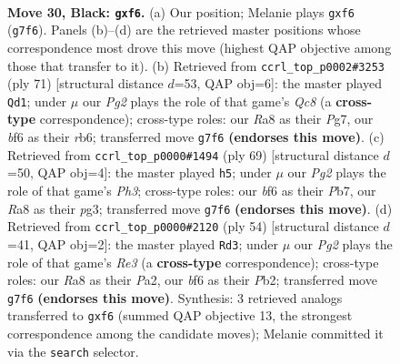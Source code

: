 \documentclass[11pt]{article}
\begin{document}
\clearpage

\begin{figure}[p]\centering
\begin{subfigure}{0.46\textwidth}\centering
\resizebox{\linewidth}{!}{%
\newchessgame
\chessboard[
  setfen={r7/2p1k1pp/3p1B2/8/pP4Q1/6P1/P4PKP/1q6 b - - 0 30},
  showmover=false,
  pgfstyle=straightmove, color=movearrow, markmove={g7-f6}
]}
\caption{}
\end{subfigure}\hfill
\begin{subfigure}{0.46\textwidth}\centering
\resizebox{\linewidth}{!}{%
\newchessgame
\chessboard[
  setfen={8/5kp1/1R2p3/p4p1p/2P2P2/3rP1P1/4QPK1/2q5 b - - 4 36},
  showmover=false,
  pgfstyle=straightmove, color=movearrow, markmove={c1-d1}
]}
\caption{}
\end{subfigure}
\\[4pt]
\begin{subfigure}{0.46\textwidth}\centering
\resizebox{\linewidth}{!}{%
\newchessgame
\chessboard[
  setfen={8/1p2Qp2/2p3kp/2P5/p7/P2qP1P1/5PK1/8 b - - 8 35},
  showmover=false,
  pgfstyle=straightmove, color=movearrow, markmove={h6-h5}
]}
\caption{}
\end{subfigure}\hfill
\begin{subfigure}{0.46\textwidth}\centering
\resizebox{\linewidth}{!}{%
\newchessgame
\chessboard[
  setfen={5rk1/5pp1/p6p/1Q1p4/3q2P1/4R2P/PP3P2/6K1 w - - 0 28},
  showmover=false,
  pgfstyle=straightmove, color=movearrow, markmove={e3-d3}
]}
\caption{}
\end{subfigure}
\caption{\textbf{Move 30, Black: \texttt{gxf6}.} (a) Our position; Melanie plays \texttt{gxf6} (\texttt{g7f6}). Panels (b)--(d) are the retrieved master positions whose correspondence most drove this move (highest QAP objective among those that transfer to it). (b) Retrieved from \texttt{ccrl\_top\_p0002\#3253} (ply 71) [structural distance $d$=53, QAP obj=6]: the master played \texttt{Qd1}; under $\mu$ our \emph{Pg2} plays the role of that game's \emph{Qc8} (a \textbf{cross-type} correspondence); cross-type roles: our \emph{R}a8 as their \emph{P}g7, our \emph{b}f6 as their \emph{r}b6; transferred move \texttt{g7f6} \textbf{(endorses this move)}. (c) Retrieved from \texttt{ccrl\_top\_p0000\#1494} (ply 69) [structural distance $d$=50, QAP obj=4]: the master played \texttt{h5}; under $\mu$ our \emph{Pg2} plays the role of that game's \emph{Ph3}; cross-type roles: our \emph{b}f6 as their \emph{P}b7, our \emph{R}a8 as their \emph{p}g3; transferred move \texttt{g7f6} \textbf{(endorses this move)}. (d) Retrieved from \texttt{ccrl\_top\_p0000\#2120} (ply 54) [structural distance $d$=41, QAP obj=2]: the master played \texttt{Rd3}; under $\mu$ our \emph{Pg2} plays the role of that game's \emph{Re3} (a \textbf{cross-type} correspondence); cross-type roles: our \emph{R}a8 as their \emph{P}a2, our \emph{b}f6 as their \emph{P}b2; transferred move \texttt{g7f6} \textbf{(endorses this move)}. Synthesis: 3 retrieved analogs transferred to \texttt{gxf6} (summed QAP objective 13, the strongest correspondence among the candidate moves); Melanie committed it via the \texttt{search} selector.}
\label{fig:thought-m59}
\end{figure}
\end{document}
